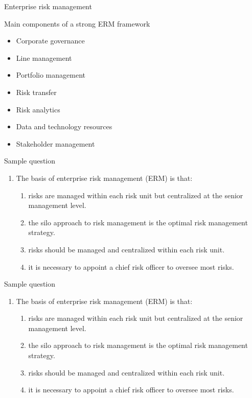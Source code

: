 \begin{frame}[allowframebreaks]{Enterprise risk management}
\begin{block}{Main components of a strong ERM framework}
	\begin{itemize}
		\item Corporate governance
		\item Line management
		\item Portfolio management
		\item Risk transfer
		\item Risk analytics
		\item Data and technology resources
		\item Stakeholder management
	\end{itemize}
\end{block}

\end{frame}

\begin{frame}{Sample question}

\begin{enumerate}
	\item The basis of enterprise risk management (ERM) is that:
	\begin{enumerate}[A]
		\item risks are managed within each risk unit but centralized at the senior
		management level.
		\item the silo approach to risk management is the optimal risk management strategy.
		\item risks should be managed and centralized within each risk unit.
		\item it is necessary to appoint a chief risk officer to oversee most risks.
	\end{enumerate}
\end{enumerate}

\end{frame}

\begin{frame}{Sample question}

\begin{enumerate}
	\item The basis of enterprise risk management (ERM) is that:
	\begin{enumerate}[A]
		\item {\color{red} risks are managed within each risk unit but centralized at the senior
		management level.}
		\item the silo approach to risk management is the optimal risk management strategy.
		\item risks should be managed and centralized within each risk unit.
		\item it is necessary to appoint a chief risk officer to oversee most risks.
	\end{enumerate}
\end{enumerate}

\end{frame}


